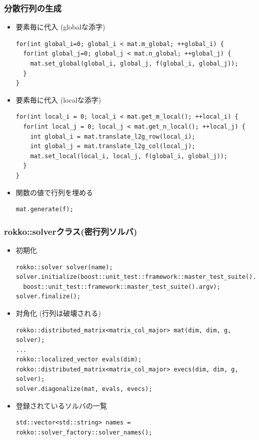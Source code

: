 \begin{frame}[c,fragile]
  \frametitle{分散行列の生成}
  \begin{itemize}
  \item 要素毎に代入 (globalな添字)
\begin{lstlisting}
for(int global_i=0; global_i < mat.m_global; ++global_i) {
  for(int global_j=0; global_j < mat.n_global; ++global_j) {
    mat.set_global(global_i, global_j, f(global_i, global_j));
  }
}
\end{lstlisting}
  \item 要素毎に代入 (localな添字)
\begin{lstlisting}
for(int local_i = 0; local_i < mat.get_m_local(); ++local_i) {
  for(int local_j = 0; local_j < mat.get_n_local(); ++local_j) {
    int global_i = mat.translate_l2g_row(local_i);
    int global_j = mat.translate_l2g_col(local_j);
    mat.set_local(local_i, local_j, f(global_i, global_j));
  }
}
\end{lstlisting}
  \item 関数の値で行列を埋める
\begin{lstlisting}
mat.generate(f);
\end{lstlisting}
  \end{itemize}
\end{frame}

\begin{frame}[c,fragile]
  \frametitle{rokko::solverクラス(密行列ソルバ)}
  \begin{itemize}
  \item 初期化
\begin{lstlisting}
rokko::solver solver(name);
solver.initialize(boost::unit_test::framework::master_test_suite().argc,
  boost::unit_test::framework::master_test_suite().argv);
solver.finalize();
\end{lstlisting}
  \item 対角化 (行列は破壊される)
\begin{lstlisting}
rokko::distributed_matrix<matrix_col_major> mat(dim, dim, g, solver);
...
rokko::localized_vector evals(dim);
rokko::distributed_matrix<matrix_col_major> evecs(dim, dim, g, solver);
solver.diagonalize(mat, evals, evecs);
\end{lstlisting}
  \item 登録されているソルバの一覧
\begin{lstlisting}
std::vector<std::string> names = rokko::solver_factory::solver_names();
\end{lstlisting}
  \end{itemize}
\end{frame}

